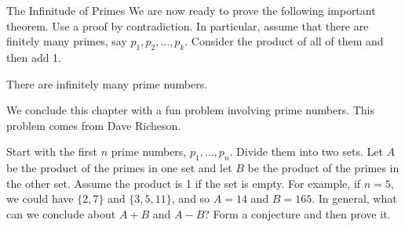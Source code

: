 \begin{section}{The Infinitude of Primes}
We are now ready to prove the following important theorem. Use a proof by contradiction. In particular, assume that there are finitely many primes, say $p_1, p_2,\ldots,p_k$.  Consider the product of all of them and then add 1.

\begin{theorem}\label{thm:infprimes}
There are infinitely many prime numbers.
\end{theorem}

We conclude this chapter with a fun problem involving prime numbers.  This problem comes from Dave Richeson.  %

\begin{problem}
Start with the first $n$ prime numbers, $p_1,\ldots, p_n$. Divide them into two sets. Let $A$ be the product of the primes in one set and let $B$ be the product of the primes in the other set. Assume the product is 1 if the set is empty. For example, if $n=5$, we could have $\{2,7\}$ and $\{3,5,11\}$, and so $A=14$ and $B=165$. In general, what can we conclude about $A+B$ and $A-B$? Form a conjecture and then prove it.
\end{problem}

\end{section}